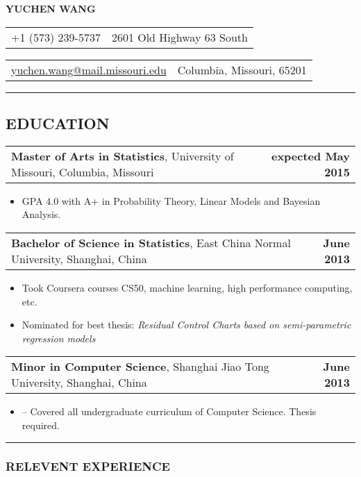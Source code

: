 \documentclass[11pt]{article}
\makeatletter
\newcommand{\headerrow}[2]
{\begin{tabular*}{\linewidth}{l@{\extracolsep{\fill}}r}
	#1 &
	#2 \\
\end{tabular*}}
\makeatother
\begin{document}
\begin{center}
	\huge\textbf{YUCHEN WANG}
\end{center}

\noindent\headerrow{+1 (573) 239-5737}{2601 Old Highway 63 South}
\headerrow
{\href{mailto:yuchen.wang@mail.missouri.edu}{yuchen.wang@mail.missouri.edu}}
{Columbia, Missouri, 65201}

\vspace{-.8em}
\hrule
\vspace{-1em}


\subsection*{\centering EDUCATION}
\vspace{-.6em}


\headerrow
	{\textbf{Master of Arts in Statistics}, University of Missouri, Columbia, Missouri}
	{\textbf{expected May 2015}}
	\begin{itemize}
		\item GPA 4.0 with A+ in Probability Theory, Linear Models and Bayesian Analysis.
	\end{itemize}

\noindent\headerrow
	{\textbf{Bachelor of Science in Statistics}, East China Normal University, Shanghai, China}
	{\textbf{June 2013}}
	\begin{itemize}
		\item Took Coursera courses CS50, machine learning, high performance computing, etc.
		\item Nominated for best thesis: \textit{Residual Control Charts based on semi-parametric regression models}
	\end{itemize}

\noindent\headerrow
	{\textbf{Minor in Computer Science}, Shanghai Jiao Tong University, Shanghai, China}
	{\textbf{June 2013}}
	\begin{itemize}
		\item -- Covered all undergraduate curriculum of Computer Science. Thesis required.
	\end{itemize}

\vspace{0.2em}
\hrule


\subsubsection*{\centering RELEVENT EXPERIENCE}
\end{document}
